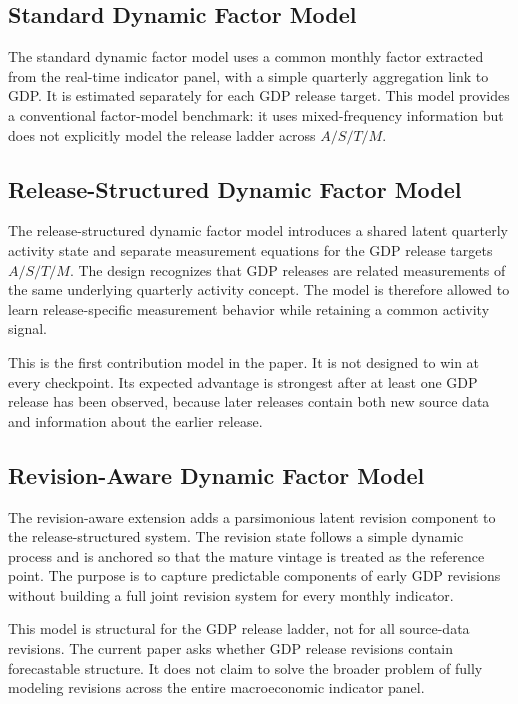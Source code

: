 \documentclass[12pt]{article}
\begin{document}
\subsection{Standard Dynamic Factor Model}

The standard dynamic factor model uses a common monthly factor extracted from the real-time indicator panel, with a simple quarterly aggregation link to GDP. It is estimated separately for each GDP release target. This model provides a conventional factor-model benchmark: it uses mixed-frequency information but does not explicitly model the release ladder across $A/S/T/M$.

\subsection{Release-Structured Dynamic Factor Model}

The release-structured dynamic factor model introduces a shared latent quarterly activity state and separate measurement equations for the GDP release targets $A/S/T/M$. The design recognizes that GDP releases are related measurements of the same underlying quarterly activity concept. The model is therefore allowed to learn release-specific measurement behavior while retaining a common activity signal.

This is the first contribution model in the paper. It is not designed to win at every checkpoint. Its expected advantage is strongest after at least one GDP release has been observed, because later releases contain both new source data and information about the earlier release.

\subsection{Revision-Aware Dynamic Factor Model}

The revision-aware extension adds a parsimonious latent revision component to the release-structured system. The revision state follows a simple dynamic process and is anchored so that the mature vintage is treated as the reference point. The purpose is to capture predictable components of early GDP revisions without building a full joint revision system for every monthly indicator.

This model is structural for the GDP release ladder, not for all source-data revisions. The current paper asks whether GDP release revisions contain forecastable structure. It does not claim to solve the broader problem of fully modeling revisions across the entire macroeconomic indicator panel.
\end{document}
